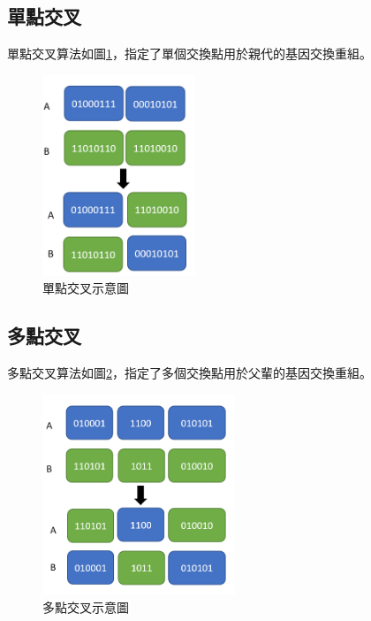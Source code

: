 		\subsection{單點交叉}
	      單點交叉算法如圖\ref{fig:SinglePointCross}，指定了單個交換點用於親代的基因交換重組。
	      \begin{figure}[H]
		      \centerline{\includegraphics[height=6cm]{pic/one.PNG}}
		      \caption{單點交叉示意圖}
		      \label{fig:SinglePointCross}
	      \end{figure}

	      \subsection{多點交叉}
	      多點交叉算法如圖\ref{fig:MultiPointCross}，指定了多個交換點用於父輩的基因交換重組。
	      \begin{figure}[H]
		      \centerline{\includegraphics[height=6cm]{pic/TWO.PNG}}
		      \caption{多點交叉示意圖}
		      \label{fig:MultiPointCross}
	      \end{figure}

